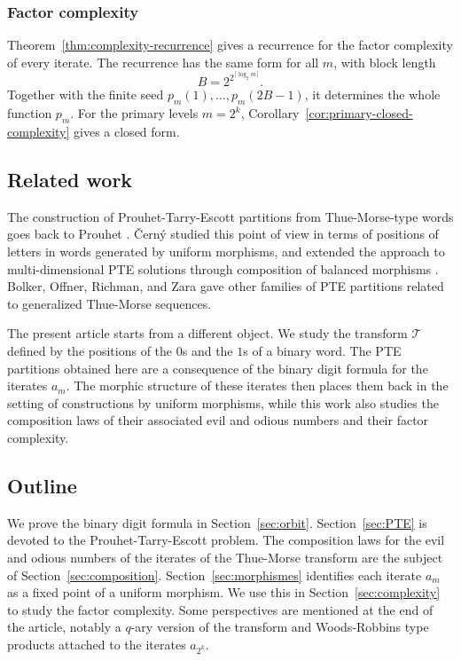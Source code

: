 \documentclass[12pt,reqno]{article}
\theoremstyle{plain}
\theoremstyle{definition}
\begin{document}
\subsubsection*{Factor complexity}

Theorem~\ref{thm:complexity-recurrence} gives a recurrence for the factor
complexity of every iterate. The recurrence has the same form for all
$m$, with block length
\[
  B=2^{2^{\lceil \log_2 m\rceil}}.
\]
Together with the finite seed $p_m(1),\ldots,p_m(2B-1)$, it determines
the whole function $p_m$. For the primary levels $m=2^k$,
Corollary~\ref{cor:primary-closed-complexity} gives a closed form.

\subsection*{Related work}

The construction of Prouhet-Tarry-Escott partitions from
Thue-Morse-type words goes back to Prouhet
\cite{Prouhet1851}. \v{C}ern\'y \cite{Cerny2013} studied this point
of view in terms of positions of letters in words generated by
uniform morphisms, and extended the approach to multi-dimensional
PTE solutions through composition of balanced morphisms
\cite{Cerny2017}. Bolker, Offner, Richman, and Zara
\cite{BolkerOffnerRichmanZara2016} gave other families of PTE
partitions related to generalized Thue-Morse sequences.

The present article starts from a different object. We study the
transform $\mathcal{T}$ defined by the positions of the $0$s and
the $1$s of a binary word. The PTE partitions obtained here are a
consequence of the binary digit formula for the iterates $a_m$. The
morphic structure of these iterates then places them back in the
setting of constructions by uniform morphisms, while this work
also studies the composition laws of their associated evil and
odious numbers and their factor complexity.

\subsection*{Outline}

We prove the binary digit formula in Section~\ref{sec:orbit}.
Section~\ref{sec:PTE} is devoted to the Prouhet-Tarry-Escott
problem. The composition laws for the evil and odious numbers of
the iterates of the Thue-Morse transform are the subject of
Section~\ref{sec:composition}. Section~\ref{sec:morphismes}
identifies each iterate $a_m$ as a fixed point of a uniform morphism. We use this in
Section~\ref{sec:complexity} to study the factor complexity. Some perspectives are mentioned at
the end of the article, notably a $q$-ary version of the transform
and Woods-Robbins type products attached to the iterates $a_{2^k}$.
\end{document}
